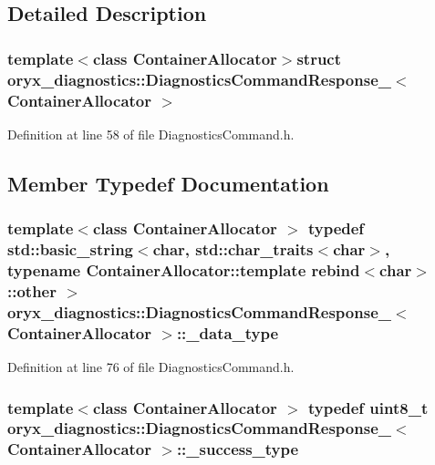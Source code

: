 \subsection{\-Detailed \-Description}
\subsubsection*{template$<$class Container\-Allocator$>$struct oryx\-\_\-diagnostics\-::\-Diagnostics\-Command\-Response\-\_\-$<$ Container\-Allocator $>$}



\-Definition at line 58 of file \-Diagnostics\-Command.\-h.



\subsection{\-Member \-Typedef \-Documentation}
\subsubsection[{\-\_\-data\-\_\-type}]{\setlength{\rightskip}{0pt plus 5cm}template$<$class Container\-Allocator $>$ typedef std\-::basic\-\_\-string$<$char, std\-::char\-\_\-traits$<$char$>$, typename \-Container\-Allocator\-::template rebind$<$char$>$\-::other $>$ {\bf oryx\-\_\-diagnostics\-::\-Diagnostics\-Command\-Response\-\_\-}$<$ \-Container\-Allocator $>$\-::{\bf \-\_\-data\-\_\-type}}\label{structoryx__diagnostics_1_1DiagnosticsCommandResponse___ac0efca5b48d0ec0d8714486e9d265db5}


\-Definition at line 76 of file \-Diagnostics\-Command.\-h.

\subsubsection[{\-\_\-success\-\_\-type}]{\setlength{\rightskip}{0pt plus 5cm}template$<$class Container\-Allocator $>$ typedef uint8\-\_\-t {\bf oryx\-\_\-diagnostics\-::\-Diagnostics\-Command\-Response\-\_\-}$<$ \-Container\-Allocator $>$\-::{\bf \-\_\-success\-\_\-type}}\label{structoryx__diagnostics_1_1DiagnosticsCommandResponse___a1ef0edbcf776dbba8f1b389a7f80f805}


